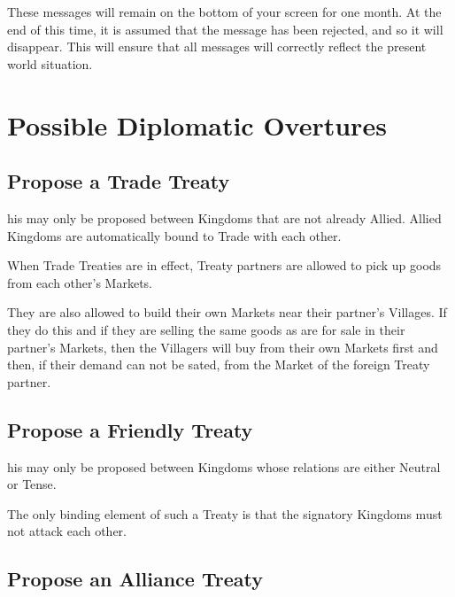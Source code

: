 These messages will remain on the bottom of your screen for one month. At the end of this time, it is assumed that the message has been rejected, and so it will disappear. This will ensure that all messages will correctly reflect the present world situation.

\section{Possible Diplomatic Overtures}


\subsection{Propose a Trade Treaty}


his may only be proposed between Kingdoms that are not already Allied. Allied Kingdoms are automatically bound to Trade with each other.

When Trade Treaties are in effect, Treaty partners are allowed to pick up goods from each other’s Markets.

They are also allowed to build their own Markets near their partner’s Villages. If they do this and if they are selling the same goods as are for sale in their partner’s Markets, then the Villagers will buy from their own Markets first and then, if their demand can not be sated, from the Market of the foreign Treaty partner.

\subsection{Propose a Friendly Treaty}


his may only be proposed between Kingdoms whose relations are either Neutral or Tense.

The only binding element of such a Treaty is that the signatory Kingdoms must not attack each other.

\subsection{Propose an Alliance Treaty}


